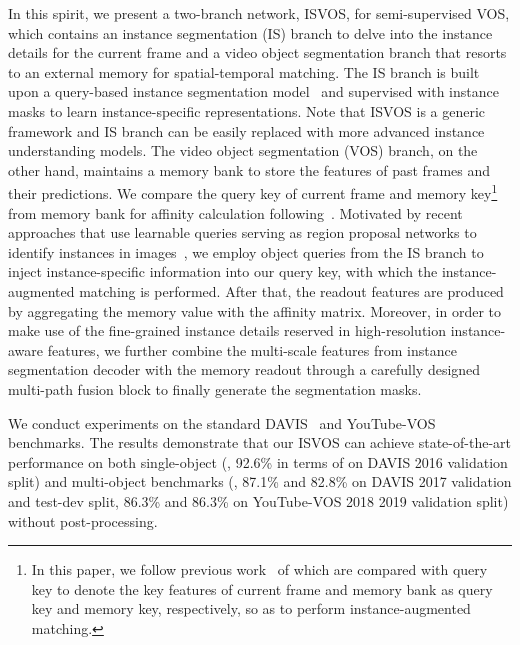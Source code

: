 \documentclass[10pt,twocolumn,letterpaper]{article}
\newcommand{\system}{ISVOS\xspace}
\begin{document}
In this spirit, we present a two-branch network, \system, for semi-supervised VOS, which contains an instance segmentation (IS) branch to delve into the instance details for the current frame and a video object segmentation branch that resorts to an external memory for spatial-temporal matching. The IS branch is built upon a query-based instance segmentation model~\cite{cheng2022masked} and supervised with instance masks to learn instance-specific representations. Note that \system is a generic framework and IS branch can be easily replaced with more advanced instance understanding models.
The video object segmentation (VOS) branch, on the other hand, maintains a memory bank to store the features of past frames and their predictions. We compare the query key of current frame and memory key\footnote{In this paper, we follow previous work~\cite{oh2019video,cheng2021stcn} of which are compared with query key to denote the key features of current frame and memory bank as query key and memory key, respectively, so as to perform instance-augmented matching.} from memory bank for affinity calculation following~\cite{oh2019video,seong2021hierarchical,cheng2021stcn,cheng2022xmem}. Motivated by recent approaches that use learnable queries serving as region proposal networks to identify instances in images~\cite{fang2021instances,cheng2021per,yang2021tracking,cheng2022masked}, we employ object queries from the IS branch to inject instance-specific information into our query key, with which the instance-augmented matching is performed. After that, the readout features are produced by aggregating the memory value with the affinity matrix. Moreover, in order to make use of the fine-grained instance details reserved in high-resolution instance-aware features, we further combine the multi-scale features from instance segmentation decoder with the memory readout through a carefully designed multi-path fusion block to finally generate the segmentation masks.

We conduct experiments on the standard DAVIS~\cite{perazzi2016benchmark,pont20172017} and YouTube-VOS~\cite{xu2018YouTube} benchmarks. The results demonstrate that our \system can achieve state-of-the-art performance on both single-object (\ie, 92.6\% in terms of  on DAVIS 2016 validation split) and multi-object benchmarks (\ie, 87.1\% and 82.8\% on DAVIS 2017 validation and test-dev split, 86.3\% and 86.3\% on YouTube-VOS 2018  2019 validation split) without post-processing. 
\end{document}
